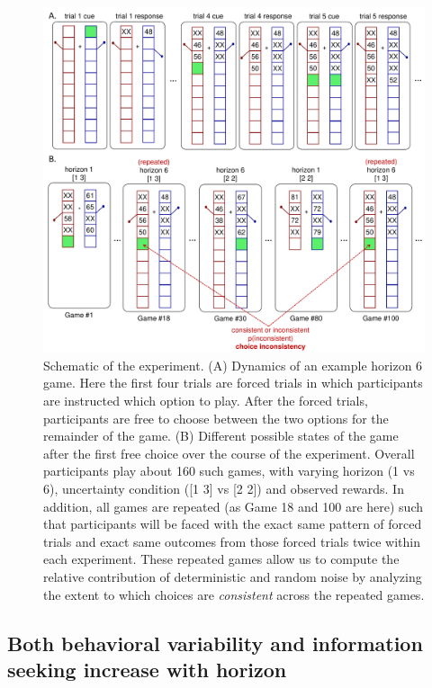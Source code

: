\documentclass[12pt]{article}
\begin{document}
	\begin{figure}[hp]
		\begin{center}
			\includegraphics[width=\textwidth]{figures/taskfiga.pdf}
			\caption{ 
			Schematic of the experiment. (A) Dynamics of an example horizon 6 game.  Here the first four trials are forced trials in which participants are instructed which option to play.  After the forced trials, participants are free to choose between the two options for the remainder of the game.  (B) Different possible states of the game after the first free choice over the course of the experiment. Overall participants play about 160 such games, with varying horizon (1 vs 6), uncertainty condition ([1 3] vs [2 2]) and observed rewards.  In addition, all games are repeated (as Game 18 and 100 are here) such that participants will be faced with the exact same pattern of forced trials and exact same outcomes from those forced trials twice within each experiment.  These repeated games allow us to compute the relative contribution of deterministic and random noise by analyzing the extent to which choices are {\em consistent} across the repeated games.}
			\label{fig:taskfig}
		\end{center}
	\end{figure}
	
	\subsection*{Both behavioral variability and information seeking increase with horizon}
	
\end{document}
